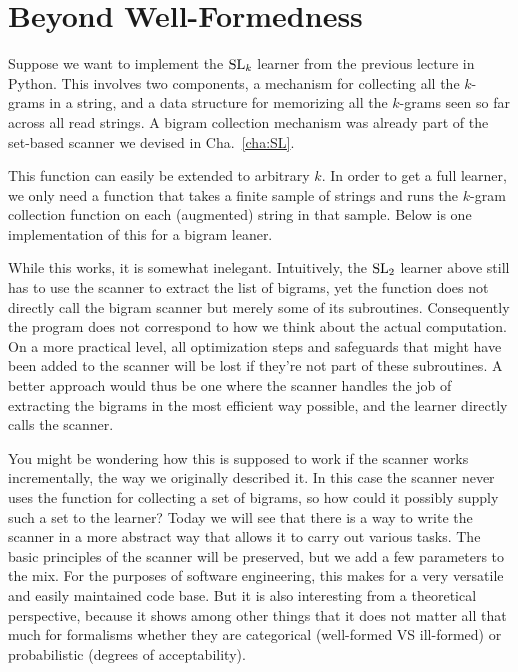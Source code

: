 \chapter{Beyond Well-Formedness}
\label{cha:PSL}

Suppose we want to implement the $\mathrm{SL}_k$ learner from the previous lecture in Python.
This involves two components, a mechanism for collecting all the $k$-grams in a string, and a data structure for memorizing all the $k$-grams seen so far across all read strings. 
A bigram collection mechanism was already part of the set-based scanner we devised in Cha.~\ref{cha:SL}.
%
\begin{center}
\end{center}
%
This function can easily be extended to arbitrary $k$.
In order to get a full learner, we only need a function that takes a finite sample of strings and runs the $k$-gram collection function on each (augmented) string in that sample.
Below is one implementation of this for a bigram leaner.
%
\begin{center}
\end{center}

While this works, it is somewhat inelegant.
Intuitively, the $\mathrm{SL}_2$ learner above still has to use the scanner to extract the list of bigrams, yet the function does not directly call the bigram scanner but merely some of its subroutines.
Consequently the program does not correspond to how we think about the actual computation.
On a more practical level, all optimization steps and safeguards that might have been added to the scanner will be lost if they're not part of these subroutines.
A better approach would thus be one where the scanner handles the job of extracting the bigrams in the most efficient way possible, and the learner directly calls the scanner.

You might be wondering how this is supposed to work if the scanner works incrementally, the way we originally described it.
In this case the scanner never uses the function for collecting a set of bigrams, so how could it possibly supply such a set to the learner?
Today we will see that there is a way to write the scanner in a more abstract way that allows it to carry out various tasks.
The basic principles of the scanner will be preserved, but we add a few parameters to the mix.
For the purposes of software engineering, this makes for a very versatile and easily maintained code base.
But it is also interesting from a theoretical perspective, because it shows among other things that it does not matter all that much for formalisms whether they are categorical (well-formed VS ill-formed) or probabilistic (degrees of acceptability).

